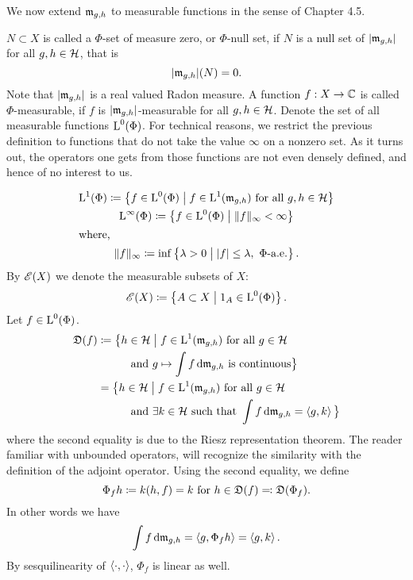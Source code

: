 % 
% 
We now extend $\mathfrak{m}_{g,h}$ to measurable functions in the sense of \cite{PedAnaN}
Chapter 4.5.
\begin{defi}
 $N \subset X$ is called a $\Phi$-set of measure zero, or $\Phi$-null set, if
 $N$ is a null set of $| \mathfrak{m}_{g,h}|$ for all $g,h \in \mathcal{H}$, that is 
 \[
  | \mathfrak{m}_{g, h} | (N) =0.
 \]
 Note that $| \mathfrak{m}_{g, h} |$ is a real valued Radon measure. 
 A function $f: X \to \mathbb{C}$ is called $\Phi$-measurable, if $f$ is 
 $|\mathfrak{m}_{g,h}|$-measurable for all $g,h \in \mathcal{H}$. 
 Denote the set of all measurable functions  ${\text{L}^0}(\Phi)$. \newline \indent
  For technical 
 reasons, we restrict the previous definition
 to functions that do not take the value $\infty$ on a nonzero set. As it turns
out, the operators one gets from those functions are not even densely defined,
and hence of no interest to us. 

 \begin{gather*}
   {\text{L}^1}(\Phi) \coloneqq \left\lbrace f \in {\text{L}^0}(\Phi) \bigm | f \in \text{L}^1 (\mathfrak{m}_{g,h}) 
   \text{ for all }g,h \in \mathcal{H} \right\rbrace \\
   {\text{L}^\infty}(\Phi) \coloneqq \left\lbrace f \in {\text{L}^0}(\Phi) \bigm |  \|f \| _\infty 
   < \infty \right\rbrace\\
   \shortintertext{where, }
  \| f \| _\infty \coloneqq  \inf \left\lbrace \lambda > 0 \bigm |
    |f| \leq \lambda,  ~\Phi\text{-a.e.}\right\rbrace.
 \end{gather*}
  By $\mathscr{E}(X)$ we denote the measurable subsets of $X$:
 \[
 \mathscr{E}(X) \coloneqq \left\lbrace A \subset X \bigm | 1_A \in {\text{L}^0}(\Phi) \right\rbrace.
 \]
 Let $f \in {\text{L}^0}(\Phi)$.
 \begin{align*}
 \mathfrak{D}(f) &\coloneqq \big\lbrace h \in \mathcal{H} \bigm | f \in \text{L}^1  (\mathfrak{m}_{g,h})
 \text{ for all } g
 \in \mathcal{H}\\
 &~~~~~~~~\text{ and } g \mapsto \int f \operatorname{d}\! \mathfrak{m}_{g, h} \text{ is continuous} 
 \big\rbrace\\
 &=  \big\lbrace h \in \mathcal{H} \bigm | f \in \text{L}^1 (\mathfrak{m}_{g,h}) \text{ for all } g \in
 \mathcal{H} \\
 &~~~~~~~~\text{ and } \exists k \in \mathcal{H} \text{ such that } \int f \operatorname{d}\! \mathfrak{m}_{g,h}
 = \left\langle g, k \right\rangle \big\rbrace
 \end{align*}
where the second equality is due to the Riesz representation theorem. The 
reader familiar with unbounded operators, will recognize the similarity
with the definition of the adjoint operator.
Using the second equality, we define 
\[
\Phi_f h \coloneqq k(h, f) = k \text{ for } h \in \mathfrak{D}(f) \eqqcolon
\mathfrak{D}(\Phi_f).
\]
In other words we have 
\[
\int f \operatorname{d}\! \mathfrak{m}_{g,h} = \left\langle g, \Phi_f h \right\rangle = \left\langle g, k \right\rangle.
\]
By sesquilinearity of $\left\langle \cdot, \cdot \right\rangle$, $\Phi_f$ is linear as well.
\end{defi}


